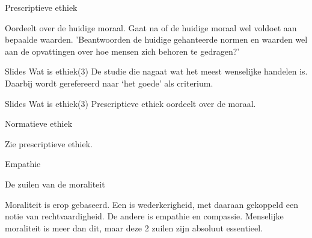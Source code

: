 \documentclass[main.tex]{subfiles}
\begin{document}
\begin{examenvraag}
    \begin{vraag}
        Prescriptieve ethiek
    \end{vraag}

    \begin{antwoord}
	    	
    	Oordeelt over de huidige moraal.
    	Gaat na of de huidige moraal wel voldoet aan bepaalde waarden. 
    	'Beantwoorden de huidige gehanteerde normen en waarden wel aan de opvattingen over hoe mensen zich behoren te gedragen?'
    		
		\begin{citaat}{Slides Wat is ethiek(3)}
				De studie die nagaat wat het meest wenselijke handelen is. 
				Daarbij wordt gerefereerd naar ‘het goede’ als criterium.
		\end{citaat}
		\begin{citaat}{Slides Wat is ethiek(3)}
				Prescriptieve ethiek oordeelt over de moraal.
		\end{citaat}
    \end{antwoord}
\end{examenvraag}


\begin{examenvraag}
    \begin{vraag}
        Normatieve ethiek
    \end{vraag}

    \begin{antwoord}
		Zie prescriptieve ethiek.
    \end{antwoord}
\end{examenvraag}


\begin{examenvraag}
    \begin{vraag}
        Empathie
    \end{vraag}

    \begin{antwoord}

    \end{antwoord}
\end{examenvraag}


\begin{examenvraag}
    \begin{vraag}
        De zuilen van de moraliteit
    \end{vraag}

    \begin{antwoord}
		Moraliteit is erop gebaseerd.
		Een is wederkerigheid, met daaraan gekoppeld een notie van rechtvaardigheid. 
		De andere is empathie en compassie. 
		Menselijke moraliteit is meer dan dit, maar deze 2 zuilen zijn absoluut essentieel.
    \end{antwoord}
\end{examenvraag}
\end{document}
